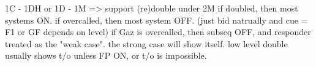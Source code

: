 1C - 1DH or 1D - 1M => support (re)double under 2M
if doubled, then most systems ON. if overcalled, then most system OFF. (just bid natrually and cue = F1 or GF depends on level)
if Gaz is overcalled, then subseq OFF, and responder treated as the "weak case". the strong case will show itself.
low level double usually shows t/o unless FP ON, or t/o is impossible.